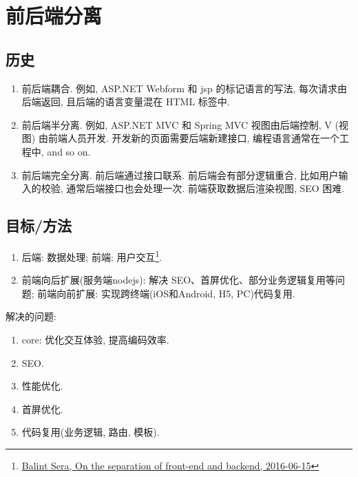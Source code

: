 \section{前后端分离}\label{ux524dux540eux7aefux5206ux79bb}

\subsection{历史}\label{ux5386ux53f2}

\begin{enumerate}
\def\labelenumi{\arabic{enumi}.}
\tightlist
\item
  前后端耦合. 例如, ASP.NET Webform 和 jsp 的标记语言的写法,
  每次请求由后端返回, 且后端的语言变量混在 HTML 标签中.
\item
  前后端半分离. 例如, ASP.NET MVC 和 Spring MVC 视图由后端控制, V (视图)
  由前端人员开发. 开发新的页面需要后端新建接口,
  编程语言通常在一个工程中, and so on.
\item
  前后端完全分离. 前后端通过接口联系. 前后端会有部分逻辑重合,
  比如用户输入的校验, 通常后端接口也会处理一次. 前端获取数据后渲染视图,
  SEO 困难.
\end{enumerate}

\subsection{目标/方法}\label{ux76eeux6807ux65b9ux6cd5}

\begin{enumerate}
\def\labelenumi{\arabic{enumi}.}
\tightlist
\item
  后端: 数据处理; 前端: 用户交互\footnote{\href{https://medium.com/@balint_sera/on-the-separation-of-front-end-and-backend-7a0809b42820}{Balint
    Sera, On the separation of front-end and backend, 2016-06-15}}.
\item
  前端向后扩展(服务端nodejs): 解决
  SEO、首屏优化、部分业务逻辑复用等问题; 前端向前扩展:
  实现跨终端(iOS和Android, H5, PC)代码复用.
\end{enumerate}

解决的问题:

\begin{enumerate}
\def\labelenumi{\arabic{enumi}.}
\setcounter{enumi}{-1}
\tightlist
\item
  core: 优化交互体验, 提高编码效率.
\item
  SEO.
\item
  性能优化.
\item
  首屏优化.
\item
  代码复用(业务逻辑, 路由, 模板).
\end{enumerate}

